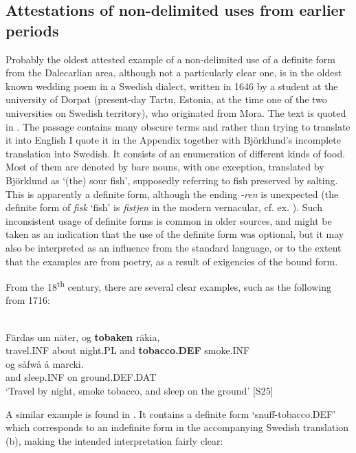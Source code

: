 \subsection{ Attestations of non-delimited uses from earlier periods}
\label{bkm:Ref154983425}

Probably the oldest attested example of a non-delimited use of a definite form from the Dalecarlian area, although not a particularly clear one, is in the oldest known wedding poem in a Swedish dialect, written in 1646 by a student at the university of Dorpat (present-day Tartu, Estonia, at the time one of the two universities on Swedish territory), who originated from Mora. The text is quoted in \citet[166]{Björklund1994}. The passage contains many obscure terms and rather than trying to translate it into English I quote it in the Appendix together with Björklund’s incomplete translation into Swedish. It consists of an enumeration of different kinds of food. Most of them are denoted by bare nouns, with one exception, translated by Björklund as  ‘(the) sour fish’, supposedly referring to fish preserved by salting. This is apparently a definite form, although the ending \textit{{}-ren} is unexpected (the definite form of \textit{fisk} ‘fish’ is \textit{fistjen} in the modern vernacular, cf. ex. ). Such inconsistent usage of definite forms is common in older sources, and might be taken as an indication that the use of the definite form was optional, but it may also be interpreted as an influence from the standard language, or to the extent that the examples are from poetry, as a result of exigencies of the bound form. 

From the 18\textsuperscript{th} century, there are several clear examples, such as the following from 1716:

\ea \label{} 
\\
\gll Färdas  um  näter,  og  \textbf{tobaken} räkia,\\
travel.INF  about  night.PL  and  \textbf{tobacco.DEF} smoke.INF\\
\gll og  såfwå  å  marcki.\\
and  sleep.INF  on   ground.DEF.DAT\\
\glt ‘Travel by night, smoke tobacco, and sleep on the ground’ [S25] 

\z

A similar example is found in \citet{Näsman1733}. It contains a definite form  ‘snuff-tobacco.DEF’ which corresponds to an indefinite form in the accompanying Swedish translation (b), making the intended interpretation fairly clear:

